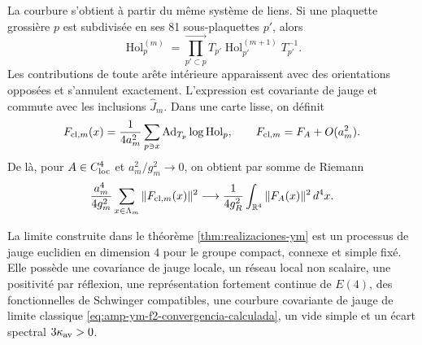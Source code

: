La courbure s’obtient à partir du même système de liens. Si une plaquette
grossière \(p\) est subdivisée en ses 81 sous-plaquettes \(p'\), alors
\begin{equation}\label{eq:amp-ym-producto-superficial}
 \operatorname{Hol}^{(m)}_{p}
 =\prod_{p'\subset p}^{\longrightarrow}
 T_{p'}\operatorname{Hol}^{(m+1)}_{p'}T_{p'}^{-1}.
\end{equation}
Les contributions de toute arête intérieure apparaissent avec des orientations
opposées et s’annulent exactement.  L’expression est covariante de jauge et
commute avec les inclusions \(\widehat J_m\).  Dans une carte lisse, on définit
\begin{equation}\label{eq:amp-ym-clover-definido}
 F_{{\rm cl},m}(x)
 =\frac1{4a_m^2}\sum_{p\ni x}
 \operatorname{Ad}_{T_p}\log\operatorname{Hol}_{p},
 \qquad
 F_{{\rm cl},m}=F_A+O(a_m^2).
\end{equation}
De là, pour \(A\in C^4_{\rm loc}\) et
\(a_m^2/g_m^2\to0\), on obtient par somme de Riemann
\begin{equation}\label{eq:amp-ym-f2-convergencia-calculada}
 \frac{a_m^4}{4g_m^2}
 \sum_{x\in\Lambda_m}\|F_{{\rm cl},m}(x)\|^2
 \longrightarrow
 \frac1{4g_R^2}\int_{\mathbb R^4}\|F_A(x)\|^2\,d^4x.
\end{equation}

\begin{theorem}
\label{thm:amp-ym-identificacion-gauge}
La limite construite dans le théorème
\ref{thm:realizaciones-ym} est un processus de jauge euclidien en dimension
\(4\) pour le groupe compact, connexe et simple fixé. Elle possède
une covariance de jauge locale, un réseau local non scalaire, une positivité par
réflexion, une représentation fortement continue de \(E(4)\),
des fonctionnelles de Schwinger compatibles, une courbure covariante de jauge de limite
classique \eqref{eq:amp-ym-f2-convergencia-calculada}, un vide simple et un écart
spectral
\(3\kappa_{\rm av}>0\).
\end{theorem}

